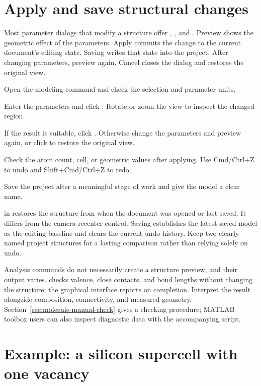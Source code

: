 \section{Apply and save structural changes}

Most parameter dialogs that modify a structure offer , , and . Preview shows the geometric effect of the parameters. Apply commits the change to the current document's editing state. Saving writes that state into the project. After changing parameters, preview again. Cancel closes the dialog and restores the original view.

\begin{steps}
  \item Open the modeling command and check the selection and parameter units.
  \item Enter the parameters and click . Rotate or zoom the view to inspect the changed region.
  \item If the result is suitable, click . Otherwise change the parameters and preview again, or click  to restore the original view.
  \item Check the atom count, cell, or geometric values after applying. Use Cmd/Ctrl+Z to undo and Shift+Cmd/Ctrl+Z to redo.
  \item Save the project after a meaningful stage of work and give the model a clear name.
\end{steps}

 in  restores the structure from when the document was opened or last saved. It differs from the camera recenter control. Saving establishes the latest saved model as the editing baseline and clears the current undo history. Keep two clearly named project structures for a lasting comparison rather than relying solely on undo.

Analysis commands do not necessarily create a structure preview, and their output varies.  checks valence, close contacts, and bond lengths without changing the structure; the graphical interface reports  on completion. Interpret the result alongside composition, connectivity, and measured geometry. Section~\ref{sec:molecule-manual-check} gives a checking procedure; MATLAB\regmark{} toolbox users can also inspect diagnostic data with the accompanying script.

\section{Example: a silicon supercell with one vacancy}

